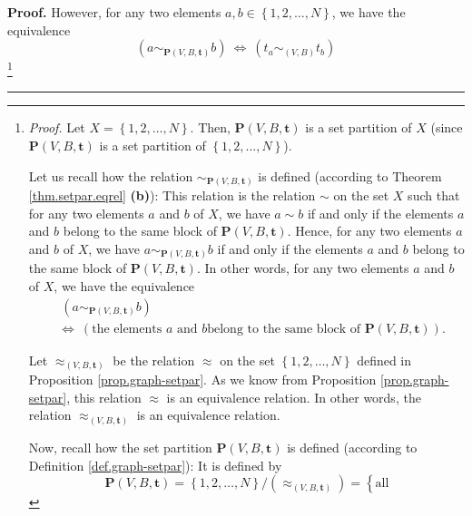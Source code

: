 \documentclass[numbers=enddot,12pt,final,onecolumn,notitlepage]{scrartcl}%
\theoremstyle{definition}
\newenvironment{proof}[1][Proof]{\noindent\textbf{#1.} }{\ \rule{0.5em}{0.5em}}
\newenvironment{verlong}{}{}
\begin{document}
\begin{proof}
\begin{verlong}
However, for any two elements $a,b\in\left\{  1,2,\ldots,N\right\}  $, we have
the equivalence
\begin{equation}
\left(  a\sim_{\mathbf{P}\left(  V,B,\mathbf{t}\right)  }b\right)
\ \Longleftrightarrow\ \left(  t_{a}\sim_{\left(  V,B\right)  }t_{b}\right)
\label{pf.lem.ncEqs.sum.equivalence}%
\end{equation}
\footnote{\textit{Proof.} Let $X=\left\{  1,2,\ldots,N\right\}  $. Then,
$\mathbf{P}\left(  V,B,\mathbf{t}\right)  $ is a set partition of $X$ (since
$\mathbf{P}\left(  V,B,\mathbf{t}\right)  $ is a set partition of $\left\{
1,2,\ldots,N\right\}  $).
\par
Let us recall how the relation $\sim_{\mathbf{P}\left(  V,B,\mathbf{t}\right)
}$ is defined (according to Theorem \ref{thm.setpar.eqrel} \textbf{(b)}): This
relation is the relation $\sim$ on the set $X$ such that for any two elements
$a$ and $b$ of $X$, we have $a\sim b$ if and only if the elements $a$ and $b$
belong to the same block of $\mathbf{P}\left(  V,B,\mathbf{t}\right)  $.
Hence, for any two elements $a$ and $b$ of $X$, we have $a\sim_{\mathbf{P}%
\left(  V,B,\mathbf{t}\right)  }b$ if and only if the elements $a$ and $b$
belong to the same block of $\mathbf{P}\left(  V,B,\mathbf{t}\right)  $. In
other words, for any two elements $a$ and $b$ of $X$, we have the equivalence%
\begin{align}
&  \ \left(  a\sim_{\mathbf{P}\left(  V,B,\mathbf{t}\right)  }b\right)
\nonumber\\
&  \Longleftrightarrow\ \left(  \text{the elements }a\text{ and }b\text{
belong to the same block of }\mathbf{P}\left(  V,B,\mathbf{t}\right)  \right)
. \label{pf.lem.ncEqs.sum.equivalence.pf.1}%
\end{align}
\par
Let $\approx_{\left(  V,B,\mathbf{t}\right)  }$ be the relation $\approx$ on
the set $\left\{  1,2,\ldots,N\right\}  $ defined in Proposition
\ref{prop.graph-setpar}. As we know from Proposition \ref{prop.graph-setpar},
this relation $\approx$ is an equivalence relation. In other words, the
relation $\approx_{\left(  V,B,\mathbf{t}\right)  }$ is an equivalence
relation.
\par
Now, recall how the set partition $\mathbf{P}\left(  V,B,\mathbf{t}\right)  $
is defined (according to Definition \ref{def.graph-setpar}): It is defined by%
\[
\mathbf{P}\left(  V,B,\mathbf{t}\right)  =\left\{  1,2,\ldots,N\right\}
/\left(  \approx_{\left(  V,B,\mathbf{t}\right)  }\right)  =\left\{  \text{all
}\]}
\end{verlong}
\end{proof}
\end{document}
